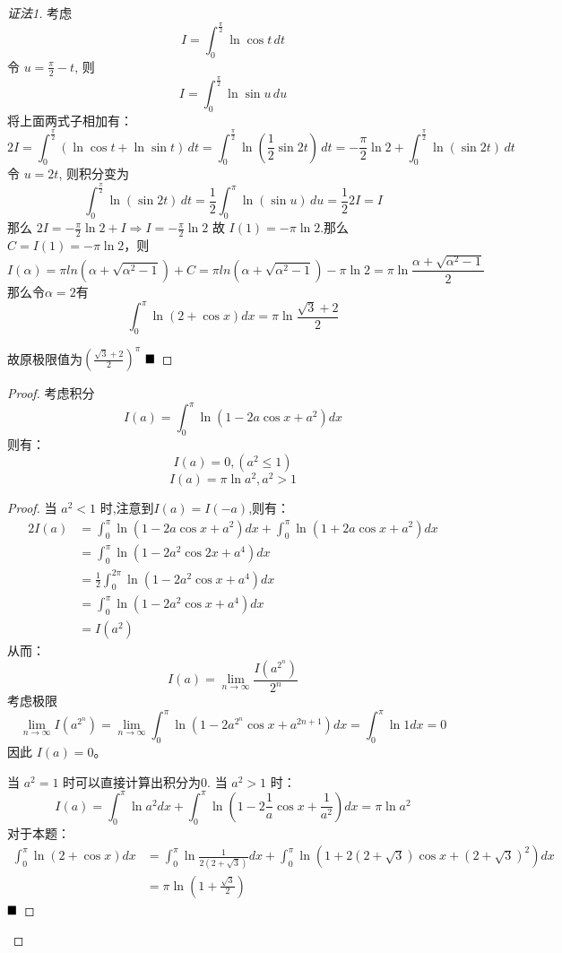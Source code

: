 \documentclass[lang=cn,newtx,10pt,scheme=chinese]{elegantbook}
\begin{document}
\begin{proof}[证法1]
    考虑 $$I = \int_0^{\frac{\pi}{2}} \ln \cos t \, dt$$
    令 $u = \frac{\pi}{2} - t$, 则 $$I = \int_0^{\frac{\pi}{2}} \ln \sin u \, du$$
    将上面两式子相加有：
    $$2I = \int_0^{\frac{\pi}{2}} (\ln \cos t + \ln \sin t) \, dt = \int_0^{\frac{\pi}{2}} \ln (\frac{1}{2} \sin 2t) \, dt = -\frac{\pi}{2}\ln 2 + \int_0^{\frac{\pi}{2}} \ln (\sin 2t) \, dt$$
    令 $u = 2t$, 则积分变为 $$\int_0^{\frac{\pi}{2}} \ln (\sin 2t) \, dt = \frac{1}{2} \int_0^\pi \ln (\sin u) \, du = \frac{1}{2} 2I = I$$
    那么 $2I = -\frac{\pi}{2}\ln 2 + I \Rightarrow I = -\frac{\pi}{2}\ln 2$
    故 $I(1) = -\pi\ln 2$.那么$C = I(1) = -\pi \ln 2$，则
    $$I(\alpha) = \pi ln(\alpha +\sqrt{\alpha^2 -1})+C= \pi ln(\alpha +\sqrt{\alpha^2 -1})-\pi \ln 2=\pi \ln \frac{\alpha+\sqrt{\alpha^2 -1}}{2}$$
    那么令$\alpha =2$有
    $$
    \int_0^{\pi} \ln(2+\cos x)dx = \pi \ln \frac{\sqrt{3}+2}{2}
    $$

    故原极限值为$\left(\frac{\sqrt{3}+2}{2}\right)^\pi$ $\hfill \blacksquare$
\end{proof}
\begin{proof}
    考虑积分 $$I(a) = \int_{0}^{\pi} \ln(1-2a\cos x + a^2)dx$$则有：
    $$ I(a) = 0, (a^2 \le 1) $$
    $$ I(a) = \pi \ln a^2, a^2 > 1 $$

    \begin{proof}
    当 $a^2 < 1$ 时,注意到$I(a)=I(-a)$,则有：
    \begin{align*} 2I(a) &= \int_{0}^{\pi} \ln(1-2a\cos x + a^2)dx + \int_{0}^{\pi} \ln(1+2a\cos x + a^2)dx \\ &= \int_{0}^{\pi} \ln(1-2a^2\cos 2x + a^4)dx \\ &= \frac{1}{2} \int_{0}^{2\pi} \ln(1-2a^2\cos x + a^4)dx \\ &= \int_{0}^{\pi} \ln(1-2a^2\cos x + a^4)dx \\ &= I(a^2)\end{align*}
    从而：
    $$ I(a) = \lim\limits_{n \to \infty} \frac{I(a^{2^n})}{2^n} $$
    考虑极限
    $$ \lim\limits_{n \to \infty} I(a^{2^n}) = \lim\limits_{n \to \infty} \int_{0}^{\pi} \ln(1-2a^{2^n}\cos x + a^{2n+1})dx = \int_{0}^{\pi} \ln 1 dx = 0 $$
    因此 $I(a)=0$。

    当 $a^2=1$ 时可以直接计算出积分为0.
    当 $a^2 > 1$ 时：
    $$ I(a) = \int_{0}^{\pi} \ln a^2 dx + \int_{0}^{\pi} \ln(1-2\frac{1}{a}\cos x + \frac{1}{a^2})dx = \pi \ln a^2 $$
    对于本题：
    \begin{align*} \int_{0}^{\pi} \ln(2+\cos x)dx &= \int_{0}^{\pi} \ln \frac{1}{2(2+\sqrt{3})} dx + \int_{0}^{\pi} \ln(1+2(2+\sqrt{3})\cos x + (2+\sqrt{3})^2)dx \\ &= \pi \ln(1+\frac{\sqrt{3}}{2}) \end{align*}
    $\hfill \blacksquare$
    \end{proof}
\end{proof}
\end{document}
